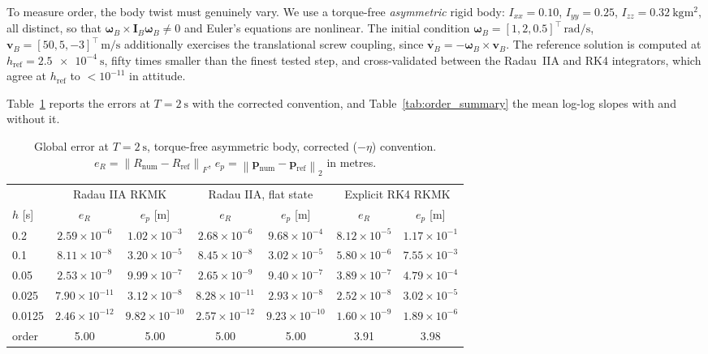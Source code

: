 \documentclass[a4paper,10pt]{article}
\newcommand{\norm}[1]{\left\lVert #1 \right\rVert}
\newcommand{\omB}{\boldsymbol{\omega}_B}
\newcommand{\vB}{\mathbf{v}_B}
\newcommand{\IB}{\mathbf{I}_B}
\theoremstyle{definition}
\begin{document}
To measure order, the body twist must genuinely vary.  We use a torque-free
\emph{asymmetric} rigid body: $I_{xx} = 0.10$, $I_{yy} = 0.25$,
$I_{zz} = 0.32\ \si{\kilogram\metre\squared}$, all distinct, so that
$\omB \times \IB\omB \neq 0$ and Euler's equations are nonlinear.  The initial
condition $\omB = [1, 2, 0.5]^\top\,\si{\radian\per\second}$,
$\vB = [50, 5, -3]^\top\,\si{\metre\per\second}$ additionally exercises the
translational screw coupling, since $\dot{\vB} = -\omB \times \vB$.  The
reference solution is computed at $h_{\mathrm{ref}} = \SI{2.5e-4}{\second}$,
fifty times smaller than the finest tested step, and cross-validated between
the Radau~IIA and RK4 integrators, which agree at $h_{\mathrm{ref}}$ to
$< 10^{-11}$ in attitude.

Table~\ref{tab:order_data} reports the errors at $T = \SI{2}{\second}$ with
the corrected convention, and Table~\ref{tab:order_summary} the mean log-log
slopes with and without it.

\begin{table}[h]
  \centering
  \caption{Global error at $T = \SI{2}{\second}$, torque-free asymmetric body,
    corrected ($-\eta$) convention.
    $e_R = \norm{R_{\mathrm{num}} - R_{\mathrm{ref}}}_F$,
    $e_p = \norm{\mathbf{p}_{\mathrm{num}} - \mathbf{p}_{\mathrm{ref}}}_2$ in
    metres.}
  \label{tab:order_data}
  \small
  \begin{tabular}{lcccccc}
    \toprule
    & \multicolumn{2}{c}{Radau IIA RKMK}
    & \multicolumn{2}{c}{Radau IIA, flat state}
    & \multicolumn{2}{c}{Explicit RK4 RKMK} \\
    \cmidrule(lr){2-3}\cmidrule(lr){4-5}\cmidrule(lr){6-7}
    $h$ [s] & $e_R$ & $e_p$ [m] & $e_R$ & $e_p$ [m] & $e_R$ & $e_p$ [m] \\
    \midrule
    0.2    & $2.59\times10^{-6}$  & $1.02\times10^{-3}$  & $2.68\times10^{-6}$  & $9.68\times10^{-4}$  & $8.12\times10^{-5}$ & $1.17\times10^{-1}$ \\
    0.1    & $8.11\times10^{-8}$  & $3.20\times10^{-5}$  & $8.45\times10^{-8}$  & $3.02\times10^{-5}$  & $5.80\times10^{-6}$ & $7.55\times10^{-3}$ \\
    0.05   & $2.53\times10^{-9}$  & $9.99\times10^{-7}$  & $2.65\times10^{-9}$  & $9.40\times10^{-7}$  & $3.89\times10^{-7}$ & $4.79\times10^{-4}$ \\
    0.025  & $7.90\times10^{-11}$ & $3.12\times10^{-8}$  & $8.28\times10^{-11}$ & $2.93\times10^{-8}$  & $2.52\times10^{-8}$ & $3.02\times10^{-5}$ \\
    0.0125 & $2.46\times10^{-12}$ & $9.82\times10^{-10}$ & $2.57\times10^{-12}$ & $9.23\times10^{-10}$ & $1.60\times10^{-9}$ & $1.89\times10^{-6}$ \\
    \midrule
    order  & 5.00 & 5.00 & 5.00 & 5.00 & 3.91 & 3.98 \\
    \bottomrule
  \end{tabular}
\end{table}
\end{document}
